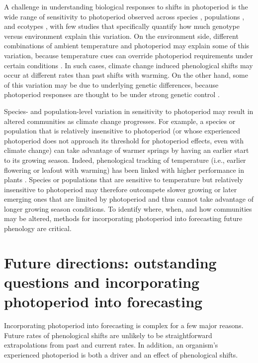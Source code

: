 \documentclass{article}
\begin{document}
 \par A challenge in understanding biological responses to shifts in photoperiod is the wide range of sensitivity to photoperiod observed across species \citep{Sanz-Perez:2009aa, zohner2016,flynn2018}, populations \citep{tanino2010}, and ecotypes \citep{Howe:1995aa}, with few studies that specifically quantify how much genotype versus environment explain this variation. On the environment side, different combinations of ambient temperature and photoperiod may explain some of this variation, because temperature cues can override photoperiod requirements under certain conditions \citep [e.g.,][] {tanino2010}. In such cases, climate change induced phenological shifts may occur at different rates than past shifts with warming. On the other hand, some of this variation may be due to underlying genetic differences, because photoperiod responses are thought to be under strong genetic control \citep{bradshaw1995,weih2004,keller2011}. 

\par Species- and population-level variation in sensitivity to photoperiod may result in altered communities as climate change progresses. For example, a species or population that is relatively insensitive to photoperiod (or whose experienced photoperiod does not approach its threshold for photoperiod effects, even with climate change) can take advantage of warmer springs by having an earlier start to its growing season. Indeed, phenological tracking of temperature (i.e., earlier flowering or leafout with warming) has been linked with higher performance in plants \citep{cleland2012}. Species or populations that are sensitive to temperature but relatively insensitive to photoperiod may therefore outcompete slower growing or later emerging ones that are limited by photoperiod and thus cannot take advantage of longer growing season conditions. To identify where, when, and how communities may be altered, methods for incorporating photoperiod into forecasting future phenology are critical. 

\section*{Future directions: outstanding questions and incorporating photoperiod into forecasting}
\par  Incorporating photoperiod into forecasting is complex for a few major reasons. Future rates of phenological shifts are unlikely to be straightforward extrapolations from past and current rates. In addition, an organism's experienced photoperiod is both a driver and an effect of phenological shifts. 
\end{document}
